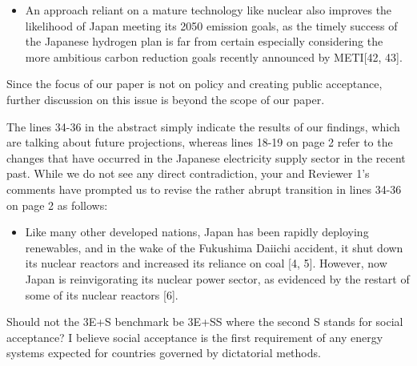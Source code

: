 \documentclass[answers,11pt]{exam}
\begin{document}
\begin{questions}
\begin{solution}
                 \begin{itemize}
                 \item An approach reliant on a mature technology like nuclear also improves the likelihood of Japan meeting its 2050 emission goals, as the timely success of the Japanese hydrogen plan is far from certain especially considering the more ambitious carbon reduction goals recently announced by METI[42, 43].
                 \end{itemize}
                 
                  Since the focus of our paper is not on policy and creating public acceptance, further discussion on this issue is beyond the scope of our paper.
                 
                 The lines 34-36 in the abstract simply indicate the results of our findings, which are talking about future projections, whereas lines 18-19 on page 2 refer to the changes that have occurred in the Japanese electricity supply sector in the recent past. While we do not see any direct contradiction, your and Reviewer 1's comments have prompted us to revise the rather abrupt transition in lines 34-36 on page 2 as follows:
                 
                 \begin{itemize}
                 
                  \item  Like many other developed nations, Japan has been rapidly deploying renewables, and in the wake of the Fukushima Daiichi accident, it shut down its nuclear reactors and increased its reliance on coal [4, 5]. However, now Japan is reinvigorating its nuclear power sector, as evidenced by the restart of some of its nuclear reactors [6].
                 
                 \end{itemize}                 
                 
                 
        \end{solution}


  
                        \question  Should not the 3E+S benchmark be 3E+SS where the second S stands for social acceptance? I believe social acceptance is the first requirement of any energy systems expected for countries governed by dictatorial methods.
        

\end{questions}
\end{document}

